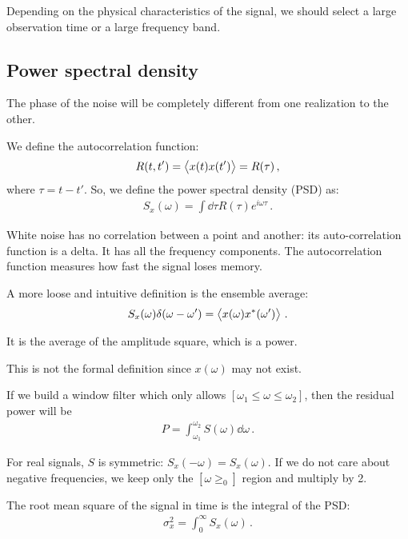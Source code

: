 \documentclass[main.tex]{subfiles}
\begin{document}
Depending on the physical characteristics of the signal, we should select a large observation time or a large frequency band.

\subsection{Power spectral density}

The phase of the noise will be completely different from one realization to the other.

We define the autocorrelation function: 
%
\begin{align}
R(t, t')  = \expval{x(t) x(t')} = R(\tau) 
\,,
\end{align}
%
where \(\tau = t - t'\). So, we define the power spectral density (PSD) as:
%
\begin{align}
S_x (\omega ) = \int  \dd{\tau } R(\tau ) e^{i \omega \tau } 
\,.
\end{align}

White noise has no correlation between a point and another: its auto-correlation function is a delta. It has all the frequency components. 
The autocorrelation function measures how fast the signal loses memory. 

A more loose and intuitive definition is the ensemble average: 
%
\begin{align}
S_x(\omega ) \delta (\omega - \omega') = \expval{x(\omega ) x^{*} (\omega')}
\,.
\end{align}

It is the average of the amplitude square, which is a power.

This is not the formal definition since \(x(\omega )\) may not exist.

If we build a window filter which only allows \([\omega_1 \leq \omega \leq \omega_2 ]\), then the residual power will be 
%
\begin{align}
P = \int_{\omega_1 }^{\omega_2 } S(\omega ) \dd{\omega }
\,.
\end{align}

For real signals, \(S\) is symmetric: \(S_x (-\omega ) = S_x (\omega )\). 
If we do not care about negative frequencies, we keep only the \([\omega \geq_0 ]\) region and multiply by 2.

The root mean square of the signal in time is the integral of the PSD: 
%
\begin{align}
\sigma^2_{x} = \int_{0}^{ \infty } S_x (\omega )
\,.
\end{align}
\end{document}
